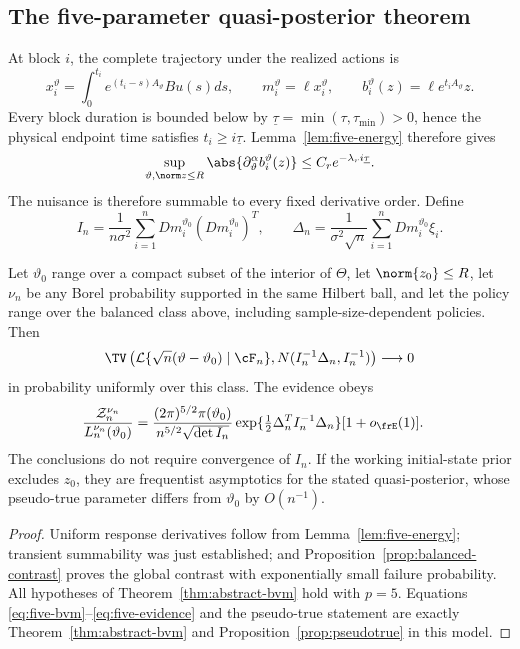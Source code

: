 \subsection{The five-parameter quasi-posterior theorem}

At block \(i\), the complete trajectory under the realized actions is
\[
 x_i^\vartheta=\int_0^{t_i}e^{(t_i-s)A_\vartheta}Bu(s)ds,
 \qquad m_i^\vartheta=\ell x_i^\vartheta,
 \qquad b_i^\vartheta(z)=\ell e^{t_iA_\vartheta}z.
\]
Every block duration is bounded below by
\(\underline\tau=\min(\tau,\tau_{\min})>0\), hence the physical endpoint
time satisfies \(t_i\ge i\underline\tau\).  Lemma~\ref{lem:five-energy}
therefore gives
\[
 \sup_{\vartheta,\norm z\le R}
 \abs{\partial_\vartheta^\alpha b_i^\vartheta(z)}
 \le C_re^{-\lambda_ri\underline\tau}.
\]
The nuisance is therefore summable to every fixed derivative order.  Define
\[
 I_n=\frac1{n\sigma^2}\sum_{i=1}^n
 Dm_i^{\vartheta_0}(Dm_i^{\vartheta_0})^T,
 \qquad
 \Delta_n=\frac1{\sigma^2\sqrt n}
 \sum_{i=1}^nDm_i^{\vartheta_0}\xi_i.
\]

\begin{theorem}
\label{thm:lattice-bvm}
Let \(\vartheta_0\) range over a compact subset of the interior of \(\Theta\),
let \(\norm{z_0}\le R\), let \(\nu_n\) be any Borel probability supported in
the same Hilbert ball, and let the policy range over the balanced class above,
including sample-size-dependent policies.  Then
\begin{equation}
 \TV\left(
 \mathcal L\{\sqrt n(\vartheta-\vartheta_0)\mid\cF_n\},
 N(I_n^{-1}\Delta_n,I_n^{-1})
 \right)\longrightarrow0
 \label{eq:five-bvm}
\end{equation}
in probability uniformly over this class.  The evidence obeys
\begin{align}
 \frac{\mathcal Z_n^{\nu_n}}{L_n^{\nu_n}(\vartheta_0)}
 ={}&\frac{(2\pi)^{5/2}\pi(\vartheta_0)}{n^{5/2}\sqrt{\det I_n}}
 \exp\{\tfrac12\Delta_n^TI_n^{-1}\Delta_n\}
 [1+o_{\frE}(1)].
 \label{eq:five-evidence}
\end{align}
The conclusions do not require convergence of \(I_n\).  If the working
initial-state prior excludes \(z_0\), they are frequentist asymptotics for the
stated quasi-posterior, whose pseudo-true parameter differs from
\(\vartheta_0\) by \(O(n^{-1})\).
\end{theorem}

\begin{proof}
Uniform response derivatives follow from Lemma~\ref{lem:five-energy};
transient summability was just established; and
Proposition~\ref{prop:balanced-contrast} proves the global contrast with
exponentially small failure probability.  All hypotheses of
Theorem~\ref{thm:abstract-bvm} hold with \(p=5\).  Equations
\eqref{eq:five-bvm}--\eqref{eq:five-evidence} and the pseudo-true statement
are exactly Theorem~\ref{thm:abstract-bvm} and
Proposition~\ref{prop:pseudotrue} in this model.
\end{proof}

